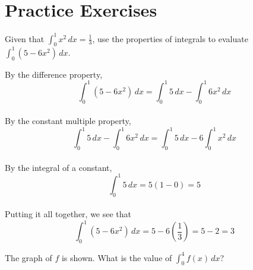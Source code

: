 \section{Practice Exercises}
\begin{Exercise}[label=defint2]
Given that $\int_{0}^{1} x^2\,dx = \frac{1}{3}$, use the properties 
of integrals to evaluate $\int_{0}^{1} (5-6x^2)\,dx$. 
\end{Exercise}

\begin{Answer}[ref=defint2]
By the difference property, $$\int_{0}^{1} (5-6x^2)\,dx = \int_{0}^{1} 
5\,dx - \int_{0}^{1} 6x^2\,dx$$\\
By the constant multiple property, $$\int_{0}^{1} 5\,dx - \int_{0}^{1} 6x^2\,
dx = \int_{0}^{1} 5\,dx - 6\int_{0}^{1} x^2\,dx$$\\
By the integral of a constant, $$\int_{0}^{1} 5\,dx = 5(1 - 0) = 5$$\\
Putting it all together, we see that $$\int_{0}^{1} (5-6x^2)\,dx = 5 
- 6(\frac{1}{3}) = 5 - 2 = 3$$
\end{Answer}

\begin{Exercise} The graph of $f$ is shown. What is 
	the value of $\int_{0}^{4} f(x)\,dx$?\\
\end{Exercise}

